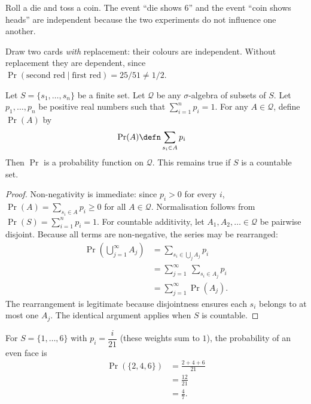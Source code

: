 \documentclass[a4paper, 12pt]{book}
\begin{document}
\begin{example}
    Roll a die and toss a coin. The event ``die shows $6$'' and the event ``coin shows heads'' are independent because the two experiments do not influence one another.
\end{example}

\begin{example}
    Draw two cards \emph{with} replacement: their colours are independent. Without replacement they are dependent, since $\Pr(\text{second red}\mid\text{first red})=25/51\neq 1/2$.
\end{example}

\begin{theorem}
    Let $S = \{s_1, \ldots, s_n\}$ be a finite set. Let $\mathcal{Q}$ be any $\sigma$-algebra of subsets of $S$. Let $p_1, \ldots, p_n$ be positive real numbers such that $\sum_{i=1}^n p_i = 1$. For any $A \in \mathcal{Q}$, define $\Pr(A)$ by
    \begin{align}
        \Pr(A) &\defn \sum_{s_i \in A} p_i
    \end{align}
    Then $\Pr$ is a probability function on $\mathcal{Q}$. This remains true if $S$ is a countable set.
\end{theorem}
\begin{proof}
    Non-negativity is immediate: since $p_i>0$ for every $i$, $\Pr(A)=\sum_{s_i\in A}p_i\geq 0$ for all $A\in\mathcal{Q}$.
    Normalisation follows from $\Pr(S)=\sum_{i=1}^n p_i=1$.
    For countable additivity, let $A_1,A_2,\ldots\in\mathcal{Q}$ be pairwise disjoint. Because all terms are non-negative, the series may be rearranged:
    \begin{align}
        \Pr\left(\bigcup_{j=1}^\infty A_j\right)
        &= \sum_{s_i \in \bigcup_j A_j} p_i\\
        &= \sum_{j=1}^\infty\ \sum_{s_i \in A_j} p_i\\
        &= \sum_{j=1}^\infty \Pr(A_j).
    \end{align}
    The rearrangement is legitimate because disjointness ensures each $s_i$ belongs to at most one $A_j$. The identical argument applies when $S$ is countable.
\end{proof}

\begin{example}
    For $S=\{1,\ldots,6\}$ with $p_i = \dfrac{i}{21}$ (these weights sum to $1$), the probability of an even face is 
    \begin{align}
        \Pr(\{2,4,6\}) &= \frac{2+4+6}{21} \\
        &= \frac{12}{21} \\
        &= \frac{4}{7}.
    \end{align}
\end{example}
\end{document}
